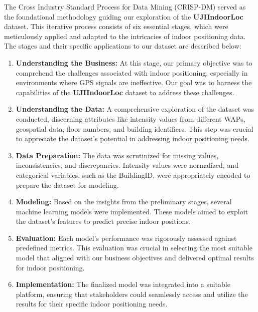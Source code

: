 \documentclass[conference]{IEEEtran}
\begin{document}
The Cross Industry Standard Process for Data Mining (CRISP-DM) served as the foundational methodology guiding our exploration of the \textbf{UJIIndoorLoc} dataset. This iterative process consists of six essential stages, which were meticulously applied and adapted to the intricacies of indoor positioning data. The stages and their specific applications to our dataset are described below:

\begin{enumerate}
    \item \textbf{Understanding the Business:} At this stage, our primary objective was to comprehend the challenges associated with indoor positioning, especially in environments where GPS signals are ineffective. Our goal was to harness the capabilities of the \textbf{UJIIndoorLoc} dataset to address these challenges.
    
    \item \textbf{Understanding the Data:} A comprehensive exploration of the dataset was conducted, discerning attributes like intensity values from different WAPs, geospatial data, floor numbers, and building identifiers. This step was crucial to appreciate the dataset's potential in addressing indoor positioning needs.
    
    \item \textbf{Data Preparation:} The data was scrutinized for missing values, inconsistencies, and discrepancies. Intensity values were normalized, and categorical variables, such as the BuildingID, were appropriately encoded to prepare the dataset for modeling.
    
    \item \textbf{Modeling:} Based on the insights from the preliminary stages, several machine learning models were implemented. These models aimed to exploit the dataset's features to predict precise indoor positions.
    
    \item \textbf{Evaluation:} Each model's performance was rigorously assessed against predefined metrics. This evaluation was crucial in selecting the most suitable model that aligned with our business objectives and delivered optimal results for indoor positioning.
    
    \item \textbf{Implementation:} The finalized model was integrated into a suitable platform, ensuring that stakeholders could seamlessly access and utilize the results for their specific indoor positioning needs.
\end{enumerate}
\end{document}
